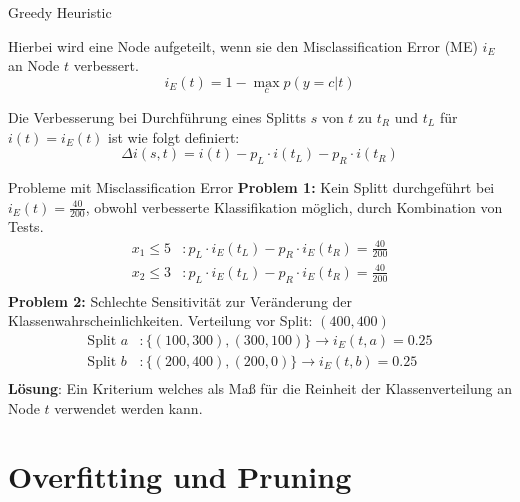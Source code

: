 \documentclass{beamer}
\begin{document}
	
	\begin{frame}{Greedy Heuristic}
	
	Hierbei wird eine Node aufgeteilt, wenn sie den Misclassification Error (ME) $i_E$ an Node $t$ verbessert.
	   \[
		   i_E (t) = 1 - \max_c p(y = c | t)
	   \]
	
	Die Verbesserung bei Durchführung eines Splitts $s$ von $t$ zu $t_R$ und $t_L$ für $i(t) = i_E (t) $ ist wie folgt definiert: 
	\[
		\Delta i(s, t) = i(t) - p_L \cdot i(t_L) - p_R \cdot i(t_R)
	\]	
	
	\end{frame}
	\begin{frame}{Probleme mit Misclassification Error}
	\textbf{Problem 1:} Kein Splitt durchgeführt bei $i_E (t) = \frac{40}{200}$, obwohl verbesserte Klassifikation möglich, durch Kombination von Tests.
	 \begin{align*}
		 x_1 \leq 5&: p_L \cdot i_E (t_L) - p_R \cdot i_E (t_R) = \frac{40}{200} \\
		x_2 \leq 3&: p_L \cdot i_E (t_L) - p_R \cdot i_E (t_R) = \frac{40}{200} \\
	 \end{align*}
	\textbf{Problem 2:}
	Schlechte Sensitivität zur Veränderung der Klassenwahrscheinlichkeiten.
	Verteilung vor Split: $(400, 400)$
	 \begin{align*}
		 \text{Split } a &: \{(100,300), (300,100)\} \rightarrow i_E (t, a) = 0.25 \\
		\text{Split } b &: \{(200,400), (200,0)\} \rightarrow i_E (t, b) = 0.25 \\
	 \end{align*}
	 \textbf{Lösung}: Ein Kriterium welches als Maß für die Reinheit der Klassenverteilung an Node $t$ verwendet werden kann.
	\end{frame}
	


\section{Overfitting und Pruning}
\end{document}
